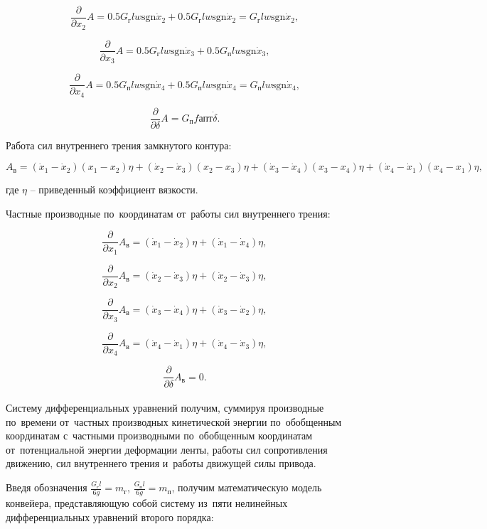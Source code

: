 $$ \frac{ \partial }{ \partial x_2} A = 0.5 G_{\text{г}} l w \text{sgn} \dot x_2 + 0.5 G_{\text{г}} l w \text{sgn} \dot x_2 = G_{\text{г}} l w \text{sgn} \dot x_2, $$

$$ \frac{ \partial }{ \partial x_3} A = 0.5 G_{\text{г}} l w \text{sgn} \dot x_3 + 0.5 G_{\text{п}} l w \text{sgn} \dot x_3, $$

$$ \frac{ \partial }{ \partial x_4} A = 0.5 G_{\text{п}} l w \text{sgn} \dot x_4 + 0.5 G_{\text{п}} l w \text{sgn} \dot x_4 = G_{\text{п}} l w \text{sgn} \dot x_4, $$

$$ \frac{ \partial }{ \partial \delta } A =  G_{\text{п}} f апт \dot \delta . $$

Работа сил внутреннего трения замкнутого контура:

$$ A_{\text{в}} = 	(\dot x_1 - \dot x_2)(x_1 - x_2) \eta + 
			(\dot x_2 - \dot x_3)(x_2 - x_3) \eta + 
			(\dot x_3 - \dot x_4)(x_3 - x_4) \eta + 
			(\dot x_4 - \dot x_1)(x_4 - x_1) \eta, $$

где $ \eta $  – приведенный коэффициент вязкости.

Частные производные по~координатам от~работы сил внутреннего трения:

$$ \frac{ \partial }{ \partial x_1} A_{\text{в}} = (\dot x_1 - \dot x_2) \eta + (\dot x_1 - \dot x_4) \eta, $$

$$ \frac{ \partial }{ \partial x_2} A_{\text{в}} = (\dot x_2 - \dot x_3) \eta + (\dot x_2 - \dot x_3) \eta, $$

$$ \frac{ \partial }{ \partial x_3} A_{\text{в}} = (\dot x_3 - \dot x_4) \eta + (\dot x_3 - \dot x_2) \eta, $$

$$ \frac{ \partial }{ \partial x_4} A_{\text{в}} = (\dot x_4 - \dot x_1) \eta + (\dot x_4 - \dot x_3) \eta, $$

$$ \frac{ \partial }{ \partial \delta} A_{\text{в}} = 0 . $$\\

Систему дифференциальных уравнений получим, суммируя производные по~времени от~частных производных кинетической энергии по~обобщенным координатам с~частными производными по~обобщенным координатам от~потенциальной энергии деформации ленты, работы сил сопротивления движению, сил внутреннего трения и~работы движущей силы привода.

Введя обозначения $ \frac{ G_{\text{г}} l }{6g} = m_{\text{г}} $, $ \frac{ G_{\text{п}} l }{6g} = m_{\text{п}} $, получим математическую модель конвейера, представляющую собой систему из~пяти нелинейных дифференциальных уравнений второго порядка: 


